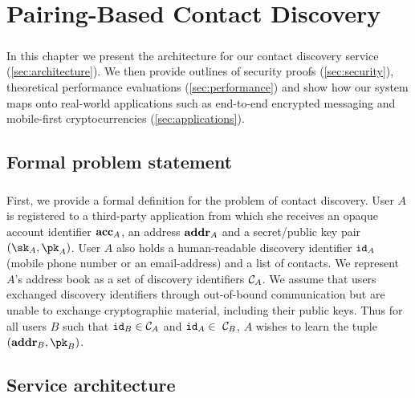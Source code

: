 \chapter{Pairing-Based Contact Discovery}
\label{chap:system}

\paragraph{} In this chapter we present the architecture for our contact discovery service (\autoref{sec:architecture}). We then provide outlines of security proofs (\autoref{sec:security}), theoretical performance evaluations (\autoref{sec:performance}) and show how our system maps onto real-world applications such as end-to-end encrypted messaging and mobile-first cryptocurrencies (\autoref{sec:applications}).


\section{Formal problem statement}
\label{sec:probstatement}

\paragraph{} First, we provide a formal definition for the problem of contact discovery. User $A$ is registered to a third-party application from which she receives an opaque account identifier $\mathbf{acc}_A$, an address $\mathbf{addr}_A$ and a secret/public key pair $(\sk_A,\pk_A)$. User $A$ also holds a human-readable discovery identifier $\mathtt{id}_A$ (mobile phone number or an email-address) and a list of contacts. We represent $A$'s address book as a set of discovery identifiers $\mathcal{C}_{A}$. We assume that users exchanged discovery identifiers through out-of-bound communication but are unable to exchange cryptographic material, including their public keys. Thus for all users $B$ such that $\mathtt{id}_B \in \mathcal{C}_{A}$ and $\mathtt{id}_A \in\ \mathcal{C}_{B}$, $A$ wishes to learn the tuple $(\addr_B, \pk_B)$.

\section{Service architecture}
\label{sec:architecture}

